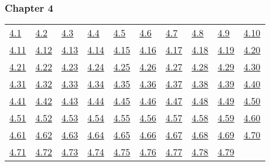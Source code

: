 \subsubsection*{Chapter 4} 

\begin{tabular}{llllllllll}
\hyperref[Exercise 4.1]{4.1} &
\hyperref[Exercise 4.2]{4.2} &
\hyperref[Exercise 4.3]{4.3} &
\hyperref[Exercise 4.4]{4.4} &
\hyperref[Exercise 4.5]{4.5} &
\hyperref[Exercise 4.6]{4.6} &
\hyperref[Exercise 4.7]{4.7} &
\hyperref[Exercise 4.8]{4.8} &
\hyperref[Exercise 4.9]{4.9} &
\hyperref[Exercise 4.10]{4.10}
\\ 
\hyperref[Exercise 4.11]{4.11} &
\hyperref[Exercise 4.12]{4.12} &
\hyperref[Exercise 4.13]{4.13} &
\hyperref[Exercise 4.14]{4.14} &
\hyperref[Exercise 4.15]{4.15} &
\hyperref[Exercise 4.16]{4.16} &
\hyperref[Exercise 4.17]{4.17} &
\hyperref[Exercise 4.18]{4.18} &
\hyperref[Exercise 4.19]{4.19} &
\hyperref[Exercise 4.20]{4.20}
\\ 
\hyperref[Exercise 4.21]{4.21} &
\hyperref[Exercise 4.22]{4.22} &
\hyperref[Exercise 4.23]{4.23} &
\hyperref[Exercise 4.24]{4.24} &
\hyperref[Exercise 4.25]{4.25} &
\hyperref[Exercise 4.26]{4.26} &
\hyperref[Exercise 4.27]{4.27} &
\hyperref[Exercise 4.28]{4.28} &
\hyperref[Exercise 4.29]{4.29} &
\hyperref[Exercise 4.30]{4.30}
\\ 
\hyperref[Exercise 4.31]{4.31} &
\hyperref[Exercise 4.32]{4.32} &
\hyperref[Exercise 4.33]{4.33} &
\hyperref[Exercise 4.34]{4.34} &
\hyperref[Exercise 4.35]{4.35} &
\hyperref[Exercise 4.36]{4.36} &
\hyperref[Exercise 4.37]{4.37} &
\hyperref[Exercise 4.38]{4.38} &
\hyperref[Exercise 4.39]{4.39} &
\hyperref[Exercise 4.40]{4.40}
\\ 
\hyperref[Exercise 4.41]{4.41} &
\hyperref[Exercise 4.42]{4.42} &
\hyperref[Exercise 4.43]{4.43} &
\hyperref[Exercise 4.44]{4.44} &
\hyperref[Exercise 4.45]{4.45} &
\hyperref[Exercise 4.46]{4.46} &
\hyperref[Exercise 4.47]{4.47} &
\hyperref[Exercise 4.48]{4.48} &
\hyperref[Exercise 4.49]{4.49} &
\hyperref[Exercise 4.50]{4.50}
\\ 
\hyperref[Exercise 4.51]{4.51} &
\hyperref[Exercise 4.52]{4.52} &
\hyperref[Exercise 4.53]{4.53} &
\hyperref[Exercise 4.54]{4.54} &
\hyperref[Exercise 4.55]{4.55} &
\hyperref[Exercise 4.56]{4.56} &
\hyperref[Exercise 4.57]{4.57} &
\hyperref[Exercise 4.58]{4.58} &
\hyperref[Exercise 4.59]{4.59} &
\hyperref[Exercise 4.60]{4.60}
\\ 
\hyperref[Exercise 4.61]{4.61} &
\hyperref[Exercise 4.62]{4.62} &
\hyperref[Exercise 4.63]{4.63} &
\hyperref[Exercise 4.64]{4.64} &
\hyperref[Exercise 4.65]{4.65} &
\hyperref[Exercise 4.66]{4.66} &
\hyperref[Exercise 4.67]{4.67} &
\hyperref[Exercise 4.68]{4.68} &
\hyperref[Exercise 4.69]{4.69} &
\hyperref[Exercise 4.70]{4.70}
\\ 
\hyperref[Exercise 4.71]{4.71} &
\hyperref[Exercise 4.72]{4.72} &
\hyperref[Exercise 4.73]{4.73} &
\hyperref[Exercise 4.74]{4.74} &
\hyperref[Exercise 4.75]{4.75} &
\hyperref[Exercise 4.76]{4.76} &
\hyperref[Exercise 4.77]{4.77} &
\hyperref[Exercise 4.78]{4.78} &
\hyperref[Exercise 4.79]{4.79} &
\end{tabular} 

